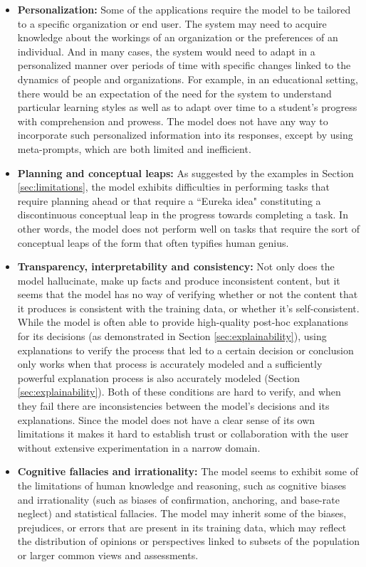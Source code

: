 \begin{itemize}
    \item \textbf{Personalization:} Some of the applications require the model to be tailored to a specific organization or end user. The system may need to acquire knowledge about the workings of an organization or the preferences of an individual. And in many cases, the system would need to adapt in a personalized manner over periods of time with specific changes linked to the dynamics of people and organizations. For example, in an educational setting, there would be an expectation of the need for the system to understand particular learning styles as well as to adapt over time to a student's progress with comprehension and prowess. The model does not have any way to incorporate such personalized information into its responses, except by using meta-prompts, which are both limited and inefficient. 
    \item \textbf{Planning and conceptual leaps:} As suggested by the examples in Section \ref{sec:limitations}, the model exhibits difficulties in performing tasks that require planning ahead or that require a ``Eureka idea" constituting a discontinuous conceptual leap in the progress towards completing a task. In other words, the model does not perform well on tasks that require the sort of conceptual leaps of the form that often typifies human genius.  
    \item \textbf{Transparency, interpretability and consistency:} Not only does the model hallucinate, make up facts and produce inconsistent content, but it seems that the model has no way of verifying whether or not the content that it produces is consistent with the training data, or whether it's self-consistent. While the model is often able to provide high-quality post-hoc explanations for its decisions (as demonstrated in Section \ref{sec:explainability}), using explanations to verify the process that led to a certain decision or conclusion only works when that process is accurately modeled and a sufficiently powerful explanation process is also accurately modeled (Section \ref{sec:explainability}). Both of these conditions are hard to verify, and when they fail there are inconsistencies between the model's decisions and its explanations. Since the model does not have a clear sense of its own limitations it makes it hard to establish trust or collaboration with the user without extensive experimentation in a narrow domain.
    \item \textbf{Cognitive fallacies and irrationality:} The model seems to exhibit some of the limitations of human knowledge and reasoning, such as cognitive biases and irrationality (such as biases of confirmation, anchoring, and base-rate neglect) and statistical fallacies. The model may inherit some of the biases, prejudices, or errors that are present in its training data, which may reflect the distribution of opinions or perspectives linked to subsets of the population or  larger common views and assessments. 

\end{itemize}
